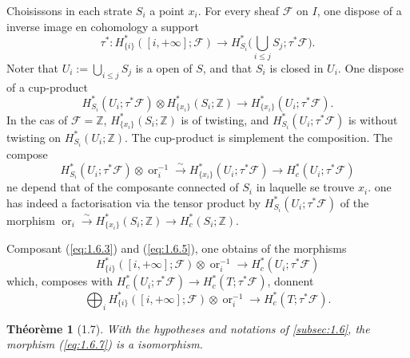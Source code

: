 \documentclass[11pt,a4paper]{article}
\theoremstyle{plain}
\newtheorem{theorem}{Th\'eor\`eme}[section]
\theoremstyle{definition}
\newcommand{\ori}{\operatorname{or}}
\begin{document}
Choisissons in each strate $S_i$ a point $x_i$. For every sheaf $\mathcal{F}$ on $I$, one dispose of a inverse image en cohomology a support
\begin{equation}\label{eq:1.6.3}
\tau^*: H^*_{\{i\}}([i,+\infty];\mathcal{F}) \longrightarrow H^*_{S_i}\Big(\bigcup_{i \leq j} S_j;\tau^*\mathcal{F}\Big).
\tag{1.6.3}
\end{equation}
Noter that $U_i := \bigcup_{i \leq j} S_j$ is a open of $S$, and that $S_i$ is closed in $U_i$. One dispose of a cup-product
\begin{equation}\label{eq:1.6.4}
H^*_{S_i}(U_i;\tau^*\mathcal{F}) \otimes H^*_{\{x_i\}}(S_i;\mathbb{Z}) \longrightarrow H^*_{\{x_i\}}(U_i;\tau^*\mathcal{F}).
\tag{1.6.4}
\end{equation}
In the cas of $\mathcal{F} = \mathbb{Z}$, $H^*_{\{x_i\}}(S_i;\mathbb{Z})$ is of twisting, and $H^*_{S_i}(U_i;\tau^*\mathcal{F})$ is without twisting on $H^*_{S_i}(U_i;\mathbb{Z})$. The cup-product is simplement the composition. The compose
\begin{equation}\label{eq:1.6.5}
H^*_{S_i}(U_i;\tau^*\mathcal{F}) \otimes \ori_i^{-1} \xrightarrow{\sim} H^*_{\{x_i\}}(U_i;\tau^*\mathcal{F}) \longrightarrow H^*_c(U_i;\tau^*\mathcal{F})
\tag{1.6.5}
\end{equation}
ne depend that of the composante connected of $S_i$ in laquelle se trouve $x_i$. one has indeed a factorisation via the tensor product by $H^*_{S_i}(U_i;\tau^*\mathcal{F})$ of the morphism $\ori_i \xrightarrow{\sim} H^*_{\{x_i\}}(S_i;\mathbb{Z}) \to H^*_c(S_i;\mathbb{Z})$.

Composant (\ref{eq:1.6.3}) and (\ref{eq:1.6.5}), one obtains of the morphisms
\begin{equation}\label{eq:1.6.6}
H^*_{\{i\}}([i,+\infty];\mathcal{F}) \otimes \ori_i^{-1} \longrightarrow H^*_c(U_i;\tau^*\mathcal{F})
\tag{1.6.6}
\end{equation}
which, composes with $H^*_c(U_i;\tau^*\mathcal{F}) \to H^*_c(T;\tau^*\mathcal{F})$, donnent
\begin{equation}\label{eq:1.6.7}
\bigoplus_i H^*_{\{i\}}([i,+\infty];\mathcal{F}) \otimes \ori_i^{-1} \longrightarrow H^*_c(T;\tau^*\mathcal{F}).
\tag{1.6.7}
\end{equation}

\begin{theorem}[1.7]\label{thm:1.7}
With the hypotheses and notations of \ref{subsec:1.6}, the morphism (\ref{eq:1.6.7}) is a isomorphism.
\end{theorem}
\end{document}
